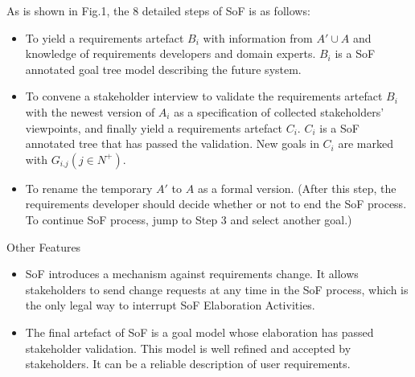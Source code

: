 ﻿\documentclass{beamer}
\begin{document}
\begin{frame}     {As is shown in Fig.1, the 8 detailed steps of SoF is as follows:}            %
  \small{
  \begin{itemize}        %
  \item %
    To yield a requirements artefact $B_i$ with information from $A'\cup A$ and knowledge of requirements developers and domain experts. $B_i$ is a SoF annotated goal tree model describing the future system. \pause
  \item %
    To convene a stakeholder interview to validate the requirements artefact  $B_i$ with the newest version of $A_i$ as a specification of collected stakeholders' viewpoints, and finally yield a requirements artefact  $C_i$. $C_i$ is a SoF annotated tree that has passed the validation. New goals in $C_i$ are marked with $G_{i.j}(j\in N^+)$.\pause
  \item %
    To rename the temporary $A'$ to $A$ as a formal version. (After this step, the requirements developer should decide whether or not to end the SoF process. To continue SoF process, jump to Step 3 and select another goal.) \pause
  \end{itemize}
  }
\end{frame}

\begin{frame} {Other Features}
  \begin{itemize}
  \item 
    SoF introduces a mechanism against requirements change. It allows stakeholders to send change requests at any time in the SoF process, which is the only legal way to interrupt SoF Elaboration Activities.\pause
  \item 
    The final artefact of SoF is a goal model whose elaboration has passed stakeholder validation. This model is well refined and accepted by stakeholders. It can be a reliable description of user requirements.\pause
  \end{itemize}
\end{frame}
\end{document}
